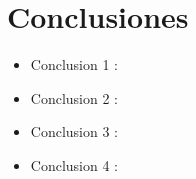 \documentclass[preprint,12pt]{elsarticle}
\begin{document}
\section{Conclusiones}

\begin{itemize}

\item Conclusion 1 : \\

\item Conclusion 2 : \\ 

\item Conclusion 3 : \\ 

\item Conclusion 4 : \\ 
\end{itemize}


	
	\newpage
	
		 
	
	
\end{document}
